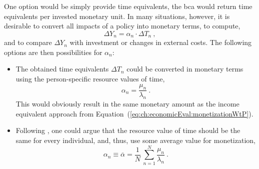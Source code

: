 One option would be simply provide time equivalents, \ie the \gls{bca} would return time equivalents per invested monetary unit.
%
In many situations, however, it is desirable to convert all impacts of a policy into monetary terms, \ie to compute,
\begin{equation}
\Delta Y_n = \alpha_n \cdot \Delta T_n \ ,
\label{eq:ch:economicEval:monetizationTime2Money}
\end{equation}
and to compare $\Delta Y_n$ with investment or changes in external costs. The following options are then possibilities for $\alpha_n$:
\begin{itemize}\styleItemize

\item
The obtained time equivalents $\Delta T_n$ could be converted in monetary terms using the person-specific resource values of time, \ie
\begin{equation}
\alpha_n = \frac{\mu_n}{\lambda_n} \ .
\label{eq:time2money-by-resource-VoT}
\end{equation}
%
This would obviously result in the same monetary amount as the income equivalent approach from Equation~(\ref{eq:ch:economicEval:monetizationWtP}). 
%
%

\item
Following \citet{MackieWorsley2013ComparisonTransportAppraisal}, one could argue that 
the resource value of time should be the same for every individual,
and, thus, use some average 
value for monetization, \eg 
\[
\alpha_n \equiv \overline\alpha = \frac{1}{N} \, \sum_{n=1}^N \frac{\mu_n}{\lambda_n} \ .
\]


\end{itemize}
